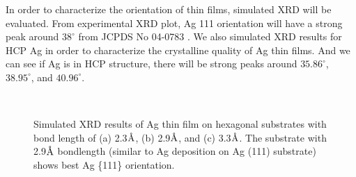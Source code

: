 In order to characterize the orientation of thin films, simulated \ac{XRD} will be evaluated. From experimental \ac{XRD} plot, Ag {111} orientation will have a strong peak around $38^{\circ}$ from JCPDS No 04-0783 \cite{AgPDF}. We also simulated \ac{XRD} results for \ac{HCP} Ag in order to characterize the crystalline quality of Ag thin films. And we can see if Ag is in \ac{HCP} structure, there will be strong peaks around $35.86^{\circ}$, $38.95^{\circ}$, and $40.96^{\circ}$.

\begingroup
\begin{figure}[!ht]
  \centering
  \label{Chap:Ag/ZnO:fig:6a}
  \label{Chap:Ag/ZnO:fig:6b}
  \\
  \label{Chap:Ag/ZnO:fig:6c}
\caption[Simulated XRD results of Ag thin film on hexagonal substrates.]{Simulated \ac{XRD} results of Ag thin film on hexagonal substrates with bond length of (a) 2.3$\mbox{\normalfont\AA}$, (b) 2.9$\mbox{\normalfont\AA}$, and (c) 3.3$\mbox{\normalfont\AA}$. The substrate with 2.9$\mbox{\normalfont\AA}$ bondlength (similar to Ag deposition on Ag (111) substrate) shows best Ag \{111\} orientation.}
  \label{Chap:Ag/ZnO:fig6}
\end{figure}
\endgroup

